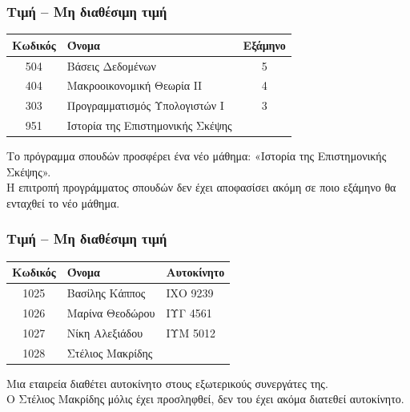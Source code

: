 \begin{frame}[t, fragile]
\frametitle{Τιμή \tnull -- Μη διαθέσιμη τιμή}
\begin{minipage}{\wE}
  \begin{tabular}{ c l c } \hline 
    {\bf Κωδικός} & {\bf Όνομα} & {\bf Εξάμηνο} \\ \hline  
    504 & Βάσεις Δεδομένων & 5 \\  
    404 & Μακροοικονομική Θεωρία ΙΙ & 4 \\  
    303 & Προγραμματισμός Υπολογιστών Ι & 3 \\  	 
    951 & Ιστορία της Επιστημονικής Σκέψης &  \\ \hline 
  \end{tabular}
  \bigskip
  \par Το πρόγραμμα σπουδών προσφέρει ένα νέο μάθημα: «Ιστορία της Επιστημονικής Σκέψης». \\ 
       Η επιτροπή προγράμματος σπουδών δεν έχει αποφασίσει ακόμη σε ποιο εξάμηνο θα ενταχθεί το νέο μάθημα.
\end{minipage}  
\end{frame}


\begin{frame}[t, fragile]
\frametitle{Τιμή \tnull -- Μη διαθέσιμη τιμή}
\begin{minipage}{\wE}
  \begin{tabular}{ c l l } \hline 
    {\bf Κωδικός} & {\bf Όνομα} & {\bf Αυτοκίνητο} \\ \hline  
    1025 & Βασίλης Κάππος   & ΙΧΟ 9239 \\  
    1026 & Μαρίνα Θεοδώρου  & ΙΥΓ 4561 \\  
    1027 & Νίκη Αλεξιάδου   & ΙΥΜ 5012 \\  
    1028 & Στέλιος Μακρίδης &  \\ \hline 
  \end{tabular}
  \bigskip
  \par Μια εταιρεία διαθέτει αυτοκίνητο στους εξωτερικούς συνεργάτες της. \\ 
       Ο Στέλιος Μακρίδης μόλις έχει προσληφθεί, δεν του έχει ακόμα διατεθεί αυτοκίνητο.
\end{minipage}  
\end{frame}


